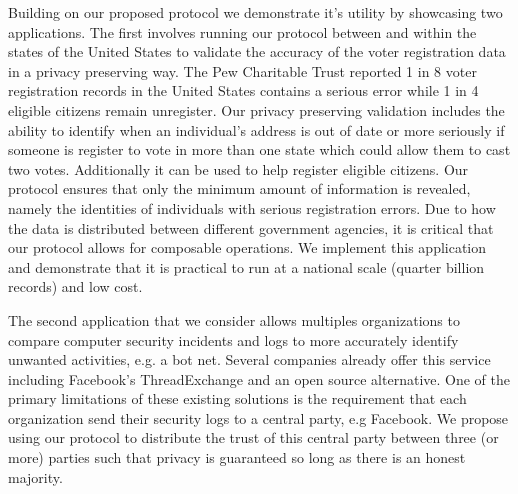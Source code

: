 Building on our proposed protocol we demonstrate it's utility by showcasing two applications. The first involves running our protocol between and within the states of the United States to validate the accuracy of the voter registration data in a privacy preserving way. The Pew Charitable Trust\cite{pew} reported 1 in 8 voter registration records in the United States contains a serious error while 1 in 4 eligible citizens remain unregister. Our privacy preserving validation includes the ability to identify when an individual's address is out of date or more seriously if someone is register to vote in more than one state which could allow them to cast two votes. Additionally it can be used to help register eligible citizens. Our protocol ensures that only the minimum amount of information is revealed, namely the identities of individuals with serious registration errors. Due to how the data is distributed between different government agencies, it is critical that our protocol allows for composable operations. We implement this application and demonstrate that it is practical to run at a national scale (quarter billion records) and low cost.

The second application that we consider allows multiples organizations to compare computer security incidents and logs to more accurately identify unwanted activities, e.g. a bot net. Several companies already offer this service including Facebook's ThreadExchange\cite{threat} and an open source alternative\cite{alt_threat}. One of the primary limitations of these existing solutions is the requirement that each organization send their security logs to a central party, e.g Facebook. We propose using our protocol to distribute the trust of this central party between three (or more) parties such that privacy is guaranteed so long as there is an honest majority.



